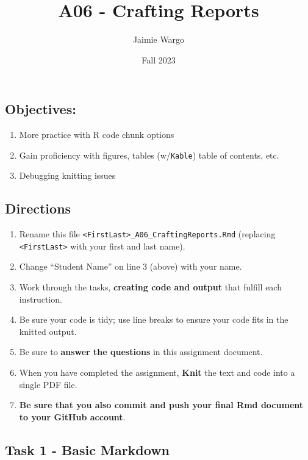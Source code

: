 \documentclass[
]{article}
\title{A06 - Crafting Reports}
\author{Jaimie Wargo}
\date{Fall 2023}
\providecommand{\tightlist}{%
  \setlength{\itemsep}{0pt}\setlength{\parskip}{0pt}}
\begin{document}
\maketitle

{
\setcounter{tocdepth}{3}
\tableofcontents
}
\hypertarget{objectives}{%
\subsection{Objectives:}\label{objectives}}

\begin{enumerate}
\def\labelenumi{\arabic{enumi}.}
\tightlist
\item
  More practice with R code chunk options
\item
  Gain proficiency with figures, tables (w/\texttt{Kable}) table of
  contents, etc.
\item
  Debugging knitting issues
\end{enumerate}

\hypertarget{directions}{%
\subsection{Directions}\label{directions}}

\begin{enumerate}
\def\labelenumi{\arabic{enumi}.}
\tightlist
\item
  Rename this file
  \texttt{\textless{}FirstLast\textgreater{}\_A06\_CraftingReports.Rmd}
  (replacing \texttt{\textless{}FirstLast\textgreater{}} with your first
  and last name).
\item
  Change ``Student Name'' on line 3 (above) with your name.
\item
  Work through the tasks, \textbf{creating code and output} that fulfill
  each instruction.
\item
  Be sure your code is tidy; use line breaks to ensure your code fits in
  the knitted output.
\item
  Be sure to \textbf{answer the questions} in this assignment document.
\item
  When you have completed the assignment, \textbf{Knit} the text and
  code into a single PDF file.
\item
  \textbf{Be sure that you also commit and push your final Rmd document
  to your GitHub account}.
\end{enumerate}

\hypertarget{task-1---basic-markdown}{%
\subsection{Task 1 - Basic Markdown}\label{task-1---basic-markdown}}
\end{document}
